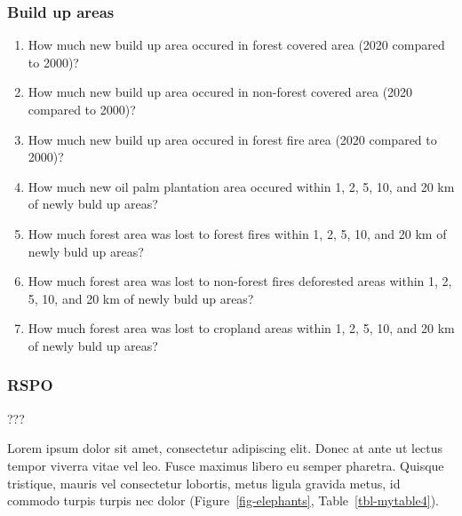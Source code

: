 \documentclass[
  letterpaper,
  DIV=11,
  numbers=noendperiod]{scrreprt}
\providecommand{\tightlist}{%
  \setlength{\itemsep}{0pt}\setlength{\parskip}{0pt}}\usepackage{longtable,booktabs,array}
\begin{document}
\hypertarget{build-up-areas}{%
\subsubsection{Build up areas}\label{build-up-areas}}

\begin{enumerate}
\def\labelenumi{\arabic{enumi}.}
\tightlist
\item
  How much new build up area occured in forest covered area (2020
  compared to 2000)?
\item
  How much new build up area occured in non-forest covered area (2020
  compared to 2000)?
\item
  How much new build up area occured in forest fire area (2020 compared
  to 2000)?
\item
  How much new oil palm plantation area occured within 1, 2, 5, 10, and
  20 km of newly buld up areas?
\item
  How much forest area was lost to forest fires within 1, 2, 5, 10, and
  20 km of newly buld up areas?
\item
  How much forest area was lost to non-forest fires deforested areas
  within 1, 2, 5, 10, and 20 km of newly buld up areas?
\item
  How much forest area was lost to cropland areas within 1, 2, 5, 10,
  and 20 km of newly buld up areas?
\end{enumerate}

\hypertarget{rspo-1}{%
\subsubsection{RSPO}\label{rspo-1}}

???

Lorem ipsum dolor sit amet, consectetur adipiscing elit. Donec at ante
ut lectus tempor viverra vitae vel leo. Fusce maximus libero eu semper
pharetra. Quisque tristique, mauris vel consectetur lobortis, metus
ligula gravida metus, id commodo turpis turpis nec dolor
(Figure~\ref{fig-elephants}, Table~\ref{tbl-mytable4}).
\end{document}
